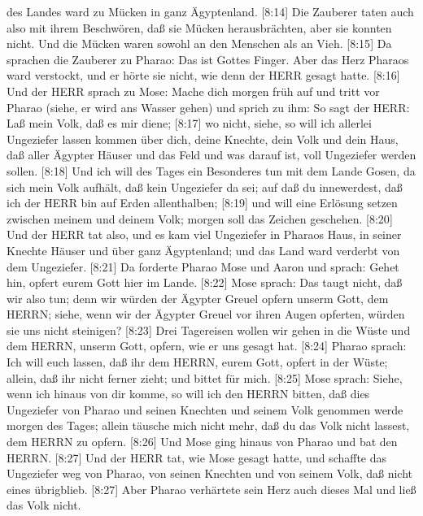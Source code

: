 des Landes ward zu Mücken in ganz Ägyptenland.  {[}8:14{]}
Die Zauberer taten auch also mit ihrem Beschwören, daß sie Mücken
herausbrächten, aber sie konnten nicht. Und die Mücken waren sowohl an
den Menschen als an Vieh.  {[}8:15{]} Da sprachen die
Zauberer zu Pharao: Das ist Gottes Finger. Aber das Herz Pharaos ward
verstockt, und er hörte sie nicht, wie denn der HERR gesagt hatte.
 {[}8:16{]} Und der HERR sprach zu Mose: Mache dich morgen
früh auf und tritt vor Pharao (siehe, er wird ans Wasser gehen) und
sprich zu ihm: So sagt der HERR: Laß mein Volk, daß es mir diene;
 {[}8:17{]} wo nicht, siehe, so will ich allerlei
Ungeziefer lassen kommen über dich, deine Knechte, dein Volk und dein
Haus, daß aller Ägypter Häuser und das Feld und was darauf ist, voll
Ungeziefer werden sollen.  {[}8:18{]} Und ich will des
Tages ein Besonderes tun mit dem Lande Gosen, da sich mein Volk aufhält,
daß kein Ungeziefer da sei; auf daß du innewerdest, daß ich der HERR bin
auf Erden allenthalben;  {[}8:19{]} und will eine Erlösung
setzen zwischen meinem und deinem Volk; morgen soll das Zeichen
geschehen.  {[}8:20{]} Und der HERR tat also, und es kam
viel Ungeziefer in Pharaos Haus, in seiner Knechte Häuser und über ganz
Ägyptenland; und das Land ward verderbt von dem Ungeziefer.
 {[}8:21{]} Da forderte Pharao Mose und Aaron und sprach:
Gehet hin, opfert eurem Gott hier im Lande.  {[}8:22{]}
Mose sprach: Das taugt nicht, daß wir also tun; denn wir würden der
Ägypter Greuel opfern unserm Gott, dem HERRN; siehe, wenn wir der
Ägypter Greuel vor ihren Augen opferten, würden sie uns nicht steinigen?
 {[}8:23{]} Drei Tagereisen wollen wir gehen in die Wüste
und dem HERRN, unserm Gott, opfern, wie er uns gesagt hat. 
{[}8:24{]} Pharao sprach: Ich will euch lassen, daß ihr dem HERRN, eurem
Gott, opfert in der Wüste; allein, daß ihr nicht ferner zieht; und
bittet für mich.  {[}8:25{]} Mose sprach: Siehe, wenn ich
hinaus von dir komme, so will ich den HERRN bitten, daß dies Ungeziefer
von Pharao und seinen Knechten und seinem Volk genommen werde morgen des
Tages; allein täusche mich nicht mehr, daß du das Volk nicht lassest,
dem HERRN zu opfern.  {[}8:26{]} Und Mose ging hinaus von
Pharao und bat den HERRN.  {[}8:27{]} Und der HERR tat, wie
Mose gesagt hatte, und schaffte das Ungeziefer weg von Pharao, von
seinen Knechten und von seinem Volk, daß nicht eines übrigblieb.
 {[}8:27{]} Aber Pharao verhärtete sein Herz auch dieses
Mal und ließ das Volk nicht.

